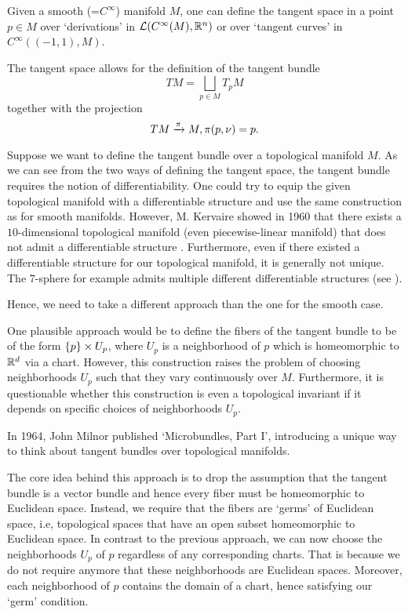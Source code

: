 \begin{myparagraph}
    Given a smooth (=$C^\infty$) manifold $M$,
    one can define the tangent space
    in a point $p \in M$ over `derivations' in $\mathcal{L}(C^\infty(M), \mathbb{R}^n)$
    or over `tangent curves' in $C^\infty((-1, 1), M)$.

    The tangent space allows for the definition of the tangent bundle
    \[ TM = \bigsqcup_{p \in M} T_p M\]
    together with the projection
    \[ TM \xrightarrow{\pi} M, \pi(p, \nu) = p. \]

    Suppose we want to define the tangent bundle over a topological manifold $M$.
    As we can see from the two ways of defining the tangent space,
    the tangent bundle requires the notion of differentiability.
    One could try to equip the given topological manifold
    with a differentiable structure and use the same construction as for smooth manifolds.
    However, M. Kervaire showed in 1960 that there exists a $10$-dimensional topological manifold
    (even piecewise-linear manifold)
    that does not admit a differentiable structure \cite{kervaire}.
    Furthermore, even if there existed a differentiable structure for our topological manifold,
    it is generally not unique. The $7$-sphere for example admits
    multiple different differentiable structures (see \cite{milnor7sphere}).

    Hence,
    we need to take a different approach than the one for the smooth case.
    
    One plausible approach would be to define the fibers of the tangent bundle
    to be of the form $\{p\} \times U_p$,
    where $U_p$ is a neighborhood of $p$ which is
    homeomorphic to $\mathbb{R}^d$ via a chart.
    However, this construction raises the problem
    of choosing neighborhoods $U_p$
    such that they vary continuously over $M$.
    Furthermore,
    it is questionable whether this construction is even a topological
    invariant if it depends on specific choices of neighborhoods $U_p$.

    In 1964, John Milnor published `Microbundles, Part I',
    introducing a unique way to think
    about tangent bundles over topological manifolds.

    The core idea behind this approach is
    to drop the assumption
    that the tangent bundle is a vector bundle and hence
    every fiber must be homeomorphic to Euclidean space.
    Instead, we require that the fibers are `germs' of Euclidean space,
    i.e, topological spaces that have an open subset homeomorphic to Euclidean space.
    In contrast to the previous approach,
    we can now choose the neighborhoods $U_p$ of $p$ regardless of any corresponding charts.
    That is because we do not require anymore that these neighborhoods are Euclidean spaces.
    Moreover, each neighborhood of $p$ contains
    the domain of a chart, hence satisfying our `germ' condition.


\end{myparagraph}
